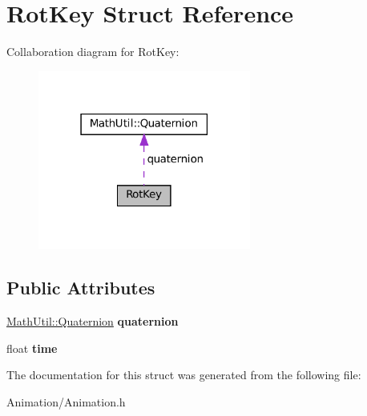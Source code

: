 \hypertarget{structRotKey}{}\section{Rot\+Key Struct Reference}
\label{structRotKey}


Collaboration diagram for Rot\+Key\+:\nopagebreak
\begin{figure}[H]
\begin{center}
\leavevmode
\includegraphics[width=198pt]{structRotKey__coll__graph}
\end{center}
\end{figure}
\subsection*{Public Attributes}
\begin{DoxyCompactItemize}
\item 
\mbox{\label{structRotKey_af4a9f13e359a47920f478f8a20c5ba49}} 
\hyperlink{structMathUtil_1_1Quaternion}{Math\+Util\+::\+Quaternion} {\bfseries quaternion}
\item 
\mbox{\label{structRotKey_a76a0f9f78231a3329da0d6b008c21dc0}} 
float {\bfseries time}
\end{DoxyCompactItemize}


The documentation for this struct was generated from the following file\+:\begin{DoxyCompactItemize}
\item 
Animation/Animation.\+h\end{DoxyCompactItemize}
